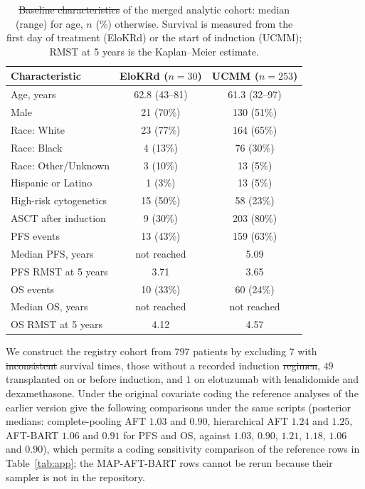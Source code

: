 \documentclass[11pt]{article}
\theoremstyle{definition}
\theoremstyle{plain}
\providecommand{\DIFaddtex}[1]{{\protect\color{blue}\uwave{#1}}} %
\providecommand{\DIFdeltex}[1]{{\protect\color{red}\sout{#1}}}                      %
\providecommand{\DIFaddbegin}{} %
\providecommand{\DIFaddend}{} %
\providecommand{\DIFdelbegin}{} %
\providecommand{\DIFdelend}{} %
\providecommand{\DIFaddFL}[1]{\DIFadd{#1}} %
\providecommand{\DIFdelFL}[1]{\DIFdel{#1}} %
\providecommand{\DIFaddbeginFL}{} %
\providecommand{\DIFaddendFL}{} %
\providecommand{\DIFdelbeginFL}{} %
\providecommand{\DIFdelendFL}{} %
\providecommand{\DIFadd}[1]{\texorpdfstring{\DIFaddtex{#1}}{#1}} %
\providecommand{\DIFdel}[1]{\texorpdfstring{\DIFdeltex{#1}}{}} %
\newcommand{\DIFscaledelfig}{0.5}
\newlength{\DIFdelgraphicswidth} %
\newlength{\DIFdelgraphicsheight} %
\newcommand{\DIFaddincludegraphics}[2][]{{\color{blue}\fbox{\DIFOincludegraphics[#1]{#2}}}} %
\newcommand{\DIFdelincludegraphics}[2][]{%
\sbox{\DIFdelgraphicsbox}{\DIFOincludegraphics[#1]{#2}}%
\settoboxwidth{\DIFdelgraphicswidth}{\DIFdelgraphicsbox} %
\settoboxtotalheight{\DIFdelgraphicsheight}{\DIFdelgraphicsbox} %
\scalebox{\DIFscaledelfig}{%
\parbox[b]{\DIFdelgraphicswidth}{\usebox{\DIFdelgraphicsbox}\\[-\baselineskip] \rule{\DIFdelgraphicswidth}{0em}}\llap{\resizebox{\DIFdelgraphicswidth}{\DIFdelgraphicsheight}{%
\setlength{\unitlength}{\DIFdelgraphicswidth}%
\begin{picture}(1,1)%
\thicklines\linethickness{2pt} %
{\color[rgb]{1,0,0}\put(0,0){\framebox(1,1){}}}%
{\color[rgb]{1,0,0}\put(0,0){\line( 1,1){1}}}%
{\color[rgb]{1,0,0}\put(0,1){\line(1,-1){1}}}%
\end{picture}%
}\hspace*{3pt}}} %
} %
\DeclareRobustCommand{\DIFaddbegin}{\DIFOaddbegin \let\includegraphics\DIFaddincludegraphics} %
\DeclareRobustCommand{\DIFaddend}{\DIFOaddend \let\includegraphics\DIFOincludegraphics} %
\DeclareRobustCommand{\DIFdelbegin}{\DIFOdelbegin \let\includegraphics\DIFdelincludegraphics} %
\DeclareRobustCommand{\DIFdelend}{\DIFOaddend \let\includegraphics\DIFOincludegraphics} %
\DeclareRobustCommand{\DIFaddbeginFL}{\DIFOaddbeginFL \let\includegraphics\DIFaddincludegraphics} %
\DeclareRobustCommand{\DIFaddendFL}{\DIFOaddendFL \let\includegraphics\DIFOincludegraphics} %
\DeclareRobustCommand{\DIFdelbeginFL}{\DIFOdelbeginFL \let\includegraphics\DIFdelincludegraphics} %
\DeclareRobustCommand{\DIFdelendFL}{\DIFOaddendFL \let\includegraphics\DIFOincludegraphics} %
\begin{document}
\begin{table}[htbp]
\centering
\caption{\DIFdelbeginFL \DIFdelFL{Baseline characteristics }\DIFdelendFL \DIFaddbeginFL \DIFaddFL{Characteristics }\DIFaddendFL of the merged analytic cohort: median (range) for age, $n$ (\%) otherwise. Survival is measured from the first day of treatment (EloKRd) or the start of induction (UCMM); RMST at 5 years is the Kaplan--Meier estimate.}
\label{tab:baseline}
\small
\begin{tabular}{lcc}
\toprule
Characteristic & EloKRd ($n=30$) & UCMM ($n=253$) \\
\midrule
Age, years & 62.8 (43--81) & 61.3 (32--97) \\
Male & 21 (70\%) & 130 (51\%) \\
Race: White & 23 (77\%) & 164 (65\%) \\
Race: Black & 4 (13\%) & 76 (30\%) \\
Race: Other/Unknown & 3 (10\%) & 13 (5\%) \\
Hispanic or Latino & 1 (3\%) & 13 (5\%) \\
High-risk cytogenetics & 15 (50\%) & 58 (23\%) \\
ASCT after induction & 9 (30\%) & 203 (80\%) \\
PFS events & 13 (43\%) & 159 (63\%) \\
Median PFS, years & not reached & 5.09 \\
PFS RMST at 5 years & 3.71 & 3.65 \\
OS events & 10 (33\%) & 60 (24\%) \\
Median OS, years & not reached & not reached \\
OS RMST at 5 years & 4.12 & 4.57 \\
\bottomrule
\end{tabular}
\end{table}

We construct the registry cohort from $797$ patients by excluding $7$ with \DIFdelbegin \DIFdel{inconsistent }\DIFdelend \DIFaddbegin \DIFadd{negative }\DIFaddend survival times, those without a recorded induction \DIFdelbegin \DIFdel{regimen}\DIFdelend \DIFaddbegin \DIFadd{start}\DIFaddend , $49$ transplanted on or before induction, and $1$ on elotuzumab with lenalidomide and dexamethasone. Under the original covariate coding the reference analyses of the earlier version give the following comparisons under the same scripts (posterior medians: complete-pooling AFT $1.03$ and $0.90$, hierarchical AFT $1.24$ and $1.25$, AFT-BART $1.06$ and $0.91$ for PFS and OS, against $1.03$, $0.90$, $1.21$, $1.18$, $1.06$ and $0.90$), which permits a coding sensitivity comparison of the reference rows in Table~\ref{tab:app}; the MAP-AFT-BART rows cannot be rerun because their sampler is not in the repository.
\end{document}
